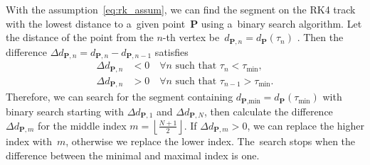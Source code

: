 		With the assumption~\ref{eq:rk_assum}, we can find the segment on the \ac{RK4} track with the lowest distance to a~given point~$\mathbf{P}$ using a~binary search algorithm. Let the distance of the point from the $n$\nobreakdash-th vertex %
		be~$d_{\mathbf{P},n} = d_{\mathbf{P}}(\tau_n)$%
		. Then the difference $\Delta d_{\mathbf{P},n} = d_{\mathbf{P},n}-d_{\mathbf{P},n-1}$ satisfies
			\begin{equation}
				\begin{aligned}
					\Delta d_{\mathbf{P},n} &< 0\quad \forall n \text{ such that } \tau_n < \tau_\text{min},\\
					\Delta d_{\mathbf{P},n} &> 0\quad \forall n \text{ such that } \tau_{n-1} > \tau_\text{min}.
				\end{aligned}
			\end{equation}
		Therefore, we can search for the segment containing $d_{\textbf{P},\text{min}} = d_{\mathbf{P}}(\tau_\text{min})$ with binary search starting with $\Delta d_{\mathbf{P},1}$ and $\Delta d_{\mathbf{P},N}$, then calculate the difference $\Delta d_{\mathbf{P},m}$ for the middle index $m = \left\lfloor\frac{N+1}{2}\right\rfloor$. If $\Delta d_{\mathbf{P},m} > 0$, we can replace the higher index with~$m$, otherwise we replace the lower index. The~search stops when the difference between the minimal and maximal index is one.
		
